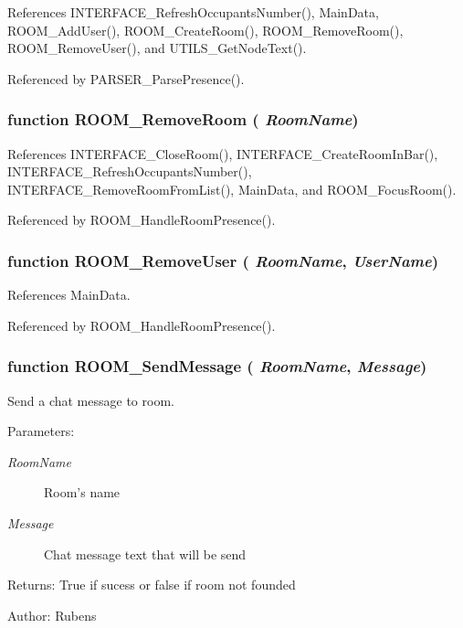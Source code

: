 References INTERFACE\_\-RefreshOccupantsNumber(), MainData, ROOM\_\-AddUser(), ROOM\_\-CreateRoom(), ROOM\_\-RemoveRoom(), ROOM\_\-RemoveUser(), and UTILS\_\-GetNodeText().

Referenced by PARSER\_\-ParsePresence().
\subsubsection[ROOM\_\-RemoveRoom]{\setlength{\rightskip}{0pt plus 5cm}function ROOM\_\-RemoveRoom ( {\em RoomName})}\label{room_2room_8js_c30944b06d7d613f1f1d9a06f9004271}




References INTERFACE\_\-CloseRoom(), INTERFACE\_\-CreateRoomInBar(), INTERFACE\_\-RefreshOccupantsNumber(), INTERFACE\_\-RemoveRoomFromList(), MainData, and ROOM\_\-FocusRoom().

Referenced by ROOM\_\-HandleRoomPresence().
\subsubsection[ROOM\_\-RemoveUser]{\setlength{\rightskip}{0pt plus 5cm}function ROOM\_\-RemoveUser ( {\em RoomName}, \/   {\em UserName})}\label{room_2room_8js_3fe1367cac303f84c7205a72319fd60f}




References MainData.

Referenced by ROOM\_\-HandleRoomPresence().
\subsubsection[ROOM\_\-SendMessage]{\setlength{\rightskip}{0pt plus 5cm}function ROOM\_\-SendMessage ( {\em RoomName}, \/   {\em Message})}\label{room_2room_8js_826f57caabe7d468297581a021fa17ef}


Send a chat message to room. 

\begin{Desc}
\item[Parameters:]
\begin{description}
\item[{\em RoomName}]Room's name \item[{\em Message}]Chat message text that will be send \end{description}
\end{Desc}
\begin{Desc}
\item[Returns:]True if sucess or false if room not founded \end{Desc}
\begin{Desc}
\item[Author:]Rubens \end{Desc}


